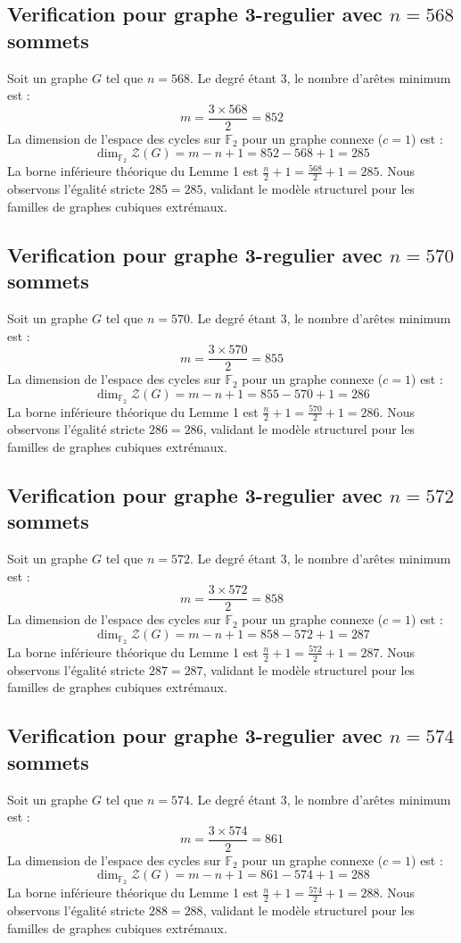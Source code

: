 \documentclass[11pt,a4paper]{article}
\begin{document}
\subsection{Verification pour graphe 3-regulier avec $n=568$ sommets}
Soit un graphe $G$ tel que $n = 568$. Le degré étant 3, le nombre d'arêtes minimum est :
$$ m = \frac{3 \times 568}{2} = 852 $$
La dimension de l'espace des cycles sur $\mathbb{F}_2$ pour un graphe connexe ($c=1$) est :
$$ \dim_{\mathbb{F}_2} \mathcal{Z}(G) = m - n + 1 = 852 - 568 + 1 = 285 $$
La borne inférieure théorique du Lemme 1 est $\frac{n}{2} + 1 = \frac{568}{2} + 1 = 285$.
Nous observons l'égalité stricte $285 = 285$, validant le modèle structurel pour les familles de graphes cubiques extrémaux.

\subsection{Verification pour graphe 3-regulier avec $n=570$ sommets}
Soit un graphe $G$ tel que $n = 570$. Le degré étant 3, le nombre d'arêtes minimum est :
$$ m = \frac{3 \times 570}{2} = 855 $$
La dimension de l'espace des cycles sur $\mathbb{F}_2$ pour un graphe connexe ($c=1$) est :
$$ \dim_{\mathbb{F}_2} \mathcal{Z}(G) = m - n + 1 = 855 - 570 + 1 = 286 $$
La borne inférieure théorique du Lemme 1 est $\frac{n}{2} + 1 = \frac{570}{2} + 1 = 286$.
Nous observons l'égalité stricte $286 = 286$, validant le modèle structurel pour les familles de graphes cubiques extrémaux.

\subsection{Verification pour graphe 3-regulier avec $n=572$ sommets}
Soit un graphe $G$ tel que $n = 572$. Le degré étant 3, le nombre d'arêtes minimum est :
$$ m = \frac{3 \times 572}{2} = 858 $$
La dimension de l'espace des cycles sur $\mathbb{F}_2$ pour un graphe connexe ($c=1$) est :
$$ \dim_{\mathbb{F}_2} \mathcal{Z}(G) = m - n + 1 = 858 - 572 + 1 = 287 $$
La borne inférieure théorique du Lemme 1 est $\frac{n}{2} + 1 = \frac{572}{2} + 1 = 287$.
Nous observons l'égalité stricte $287 = 287$, validant le modèle structurel pour les familles de graphes cubiques extrémaux.

\subsection{Verification pour graphe 3-regulier avec $n=574$ sommets}
Soit un graphe $G$ tel que $n = 574$. Le degré étant 3, le nombre d'arêtes minimum est :
$$ m = \frac{3 \times 574}{2} = 861 $$
La dimension de l'espace des cycles sur $\mathbb{F}_2$ pour un graphe connexe ($c=1$) est :
$$ \dim_{\mathbb{F}_2} \mathcal{Z}(G) = m - n + 1 = 861 - 574 + 1 = 288 $$
La borne inférieure théorique du Lemme 1 est $\frac{n}{2} + 1 = \frac{574}{2} + 1 = 288$.
Nous observons l'égalité stricte $288 = 288$, validant le modèle structurel pour les familles de graphes cubiques extrémaux.
\end{document}
